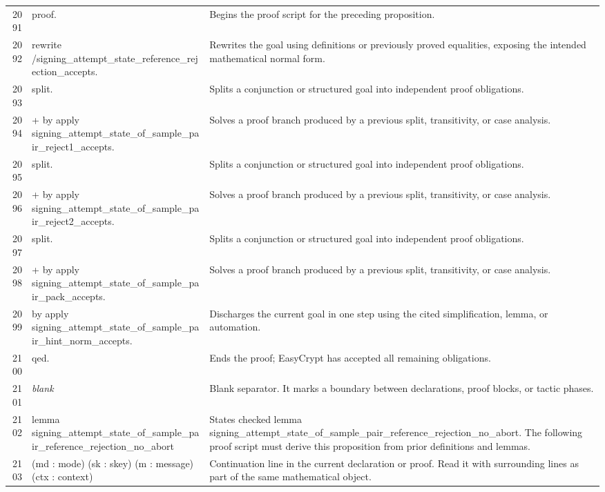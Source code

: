 \documentclass[10pt]{article}
\begin{document}
\begin{longtable}{r L{0.53\textwidth} L{0.37\textwidth}}
2091 & {\ttfamily\scriptsize proof.} & Begins the proof script for the preceding proposition. \\
2092 & {\ttfamily\scriptsize rewrite /signing\_attempt\_state\_reference\_rejection\_accepts.} & Rewrites the goal using definitions or previously proved equalities, exposing the intended mathematical normal form. \\
2093 & {\ttfamily\scriptsize split.} & Splits a conjunction or structured goal into independent proof obligations. \\
2094 & {\ttfamily\scriptsize + by apply signing\_attempt\_state\_of\_sample\_pair\_reject1\_accepts.} & Solves a proof branch produced by a previous split, transitivity, or case analysis. \\
2095 & {\ttfamily\scriptsize split.} & Splits a conjunction or structured goal into independent proof obligations. \\
2096 & {\ttfamily\scriptsize + by apply signing\_attempt\_state\_of\_sample\_pair\_reject2\_accepts.} & Solves a proof branch produced by a previous split, transitivity, or case analysis. \\
2097 & {\ttfamily\scriptsize split.} & Splits a conjunction or structured goal into independent proof obligations. \\
2098 & {\ttfamily\scriptsize + by apply signing\_attempt\_state\_of\_sample\_pair\_pack\_accepts.} & Solves a proof branch produced by a previous split, transitivity, or case analysis. \\
2099 & {\ttfamily\scriptsize by apply signing\_attempt\_state\_of\_sample\_pair\_hint\_norm\_accepts.} & Discharges the current goal in one step using the cited simplification, lemma, or automation. \\
2100 & {\ttfamily\scriptsize qed.} & Ends the proof; EasyCrypt has accepted all remaining obligations. \\
2101 & {\ttfamily\scriptsize \emph{blank}} & Blank separator.  It marks a boundary between declarations, proof blocks, or tactic phases. \\
2102 & {\ttfamily\scriptsize lemma signing\_attempt\_state\_of\_sample\_pair\_reference\_rejection\_no\_abort} & States checked lemma signing\_attempt\_state\_of\_sample\_pair\_reference\_rejection\_no\_abort.  The following proof script must derive this proposition from prior definitions and lemmas. \\
2103 & {\ttfamily\scriptsize    (md : mode) (sk : skey) (m : message) (ctx : context)} & Continuation line in the current declaration or proof.  Read it with surrounding lines as part of the same mathematical object. \\

\end{longtable}
\end{document}
